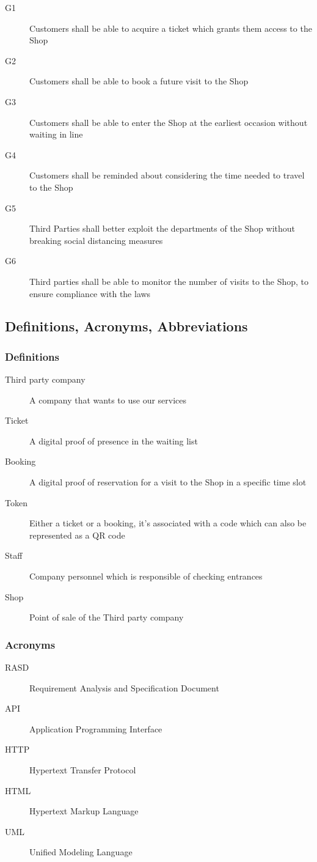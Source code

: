 \begin{description}
    \item [G1] Customers shall be able to acquire a ticket which grants them access to the Shop
    \item [G2]  Customers shall be able to book a future visit to the Shop
    \item [G3]  Customers shall be able to enter the Shop at the earliest occasion without waiting in line
    \item [G4]  Customers shall be reminded about considering the time needed to travel to the Shop
    \item [G5]  Third Parties shall better exploit the departments of the Shop without breaking social distancing measures
    \item [G6]  Third parties shall be able to monitor the number of visits to the Shop, to ensure compliance with the laws
\end{description}

\subsection{Definitions, Acronyms, Abbreviations}
\subsubsection{Definitions}

\begin{description}
    \item [Third party company] A company that wants to use our services
    \item [Ticket] A digital proof of presence in the waiting list
    \item [Booking] A digital proof of reservation for a visit to the Shop in a specific time slot
    \item [Token] Either a ticket or a booking, it's associated with a code which can also be represented as a QR code
    \item [Staff] Company personnel which is responsible of checking entrances
    \item [Shop] Point of sale of the Third party company
\end{description}
\subsubsection{Acronyms}

\begin{description}
    \item [RASD] Requirement Analysis and Specification Document
    \item [API] Application Programming Interface
    \item [HTTP] Hypertext Transfer Protocol
    \item [HTML] Hypertext Markup Language
    \item [UML] Unified Modeling Language
\end{description}
